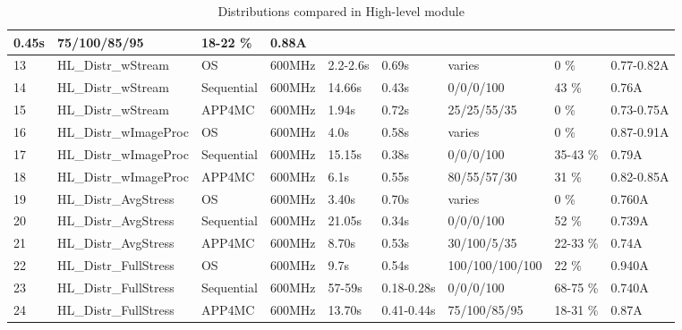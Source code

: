 {\begin{table}[!ht]
{\begin{tabular}{|l|l|l|l|l|l|l|l|l|}
				0.45s &
				75/100/85/95 &
				18-22 \% &
				0.88A \\
				\hline
				13 &
				HL{\_}Distr{\_}wStream &
				OS &
				600MHz &
				2.2-2.6s &
				0.69s &
				varies &
				0 \% &
				0.77-0.82A \\
				\hline
				14 &
				HL{\_}Distr{\_}wStream &
				Sequential &
				600MHz &
				14.66s &
				0.43s &
				0/0/0/100 &
				43 \% &
				0.76A \\
				\hline
				15 &
				HL{\_}Distr{\_}wStream &
				APP4MC &
				600MHz &
				1.94s &
				0.72s &
				25/25/55/35 &
				0 \% &
				0.73-0.75A \\
				\hline
				16 &
				HL{\_}Distr{\_}wImageProc &
				OS &
				600MHz &
				4.0s &
				0.58s &
				varies&
				0 \% &
				0.87-0.91A \\
				\hline
				17 &
				HL{\_}Distr{\_}wImageProc &
				Sequential &
				600MHz &
				15.15s &
				0.38s &
				0/0/0/100 &
				35-43 \% &
				0.79A \\
				\hline
				18 &
				HL{\_}Distr{\_}wImageProc &
				APP4MC &
				600MHz &
				6.1s &
				0.55s &
				80/55/57/30 &
				31 \% &
				0.82-0.85A \\
				\hline
				19 &
				HL{\_}Distr{\_}AvgStress &
				OS &
				600MHz &
				3.40s &
				0.70s &
				varies  &
				0 \% &
				0.760A \\
				\hline
				20 &
				HL{\_}Distr{\_}AvgStress &
				Sequential &
				600MHz &
				21.05s &
				0.34s &
				0/0/0/100 &
				52 \% &
				0.739A \\
				\hline
				21 &
				HL{\_}Distr{\_}AvgStress &
				APP4MC &
				600MHz &
				8.70s &
				0.53s &
				30/100/5/35 &
				22-33 \% &
				0.74A \\
				\hline
				22 &
				HL{\_}Distr{\_}FullStress &
				OS &
				600MHz &
				9.7s &
				0.54s &
				100/100/100/100 &
				22 \% &
				0.940A \\
				\hline
				23 &
				HL{\_}Distr{\_}FullStress &
				Sequential &
				600MHz &
				57-59s &
				0.18-0.28s &
				0/0/0/100 &
				68-75 \% &
				0.740A \\
				\hline
				24 &
				HL{\_}Distr{\_}FullStress &
				APP4MC &
				600MHz &
				13.70s &
				0.41-0.44s &
				75/100/85/95 &
				18-31 \% &
				0.87A \\
				\hline
			\end{tabular}
		}
		\caption{Distributions compared in High-level module}
		\label{tbl_hlcomparison}
	\end{table}
}

